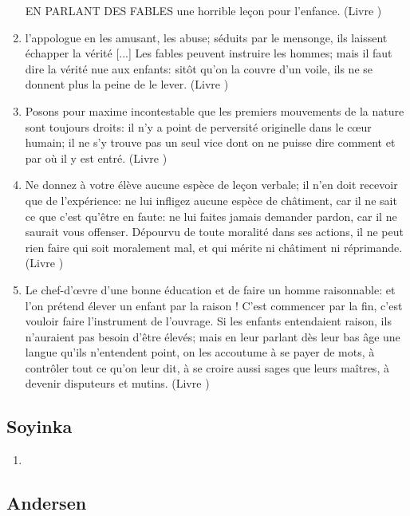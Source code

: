 \documentclass[a4paper, 11pt, hidelinks]{article}
\newcommand{\rb}[1]{\Romanbar{#1}}
\begin{document}
\begin{enumerate}
    \item [EN PARLANT DES FABLES] une horrible leçon pour l'enfance. (Livre \rb{2})
    \item l'appologue en les amusant, les abuse; séduits par le mensonge, ils laissent échapper la vérité [...] Les fables peuvent instruire les hommes; mais il faut dire la vérité nue aux enfants: sitôt qu'on la couvre d'un voile, ils ne se donnent plus la peine de le lever. (Livre \rb{2})
    \item Posons pour maxime incontestable que les premiers mouvements de la nature sont toujours droits: il n'y a point de perversité originelle dans le c\oe ur humain; il ne s'y trouve pas un seul vice dont on ne puisse dire comment et par où il y est entré. (Livre \rb{2})
    \item Ne donnez à votre élève aucune espèce de leçon verbale; il n'en doit recevoir que de l'expérience: ne lui infligez aucune espèce de châtiment, car il ne sait ce que c'est qu'être en faute: ne lui faites jamais demander pardon, car il ne saurait vous offenser. Dépourvu de toute moralité dans ses actions, il ne peut rien faire qui soit moralement mal, et qui mérite ni châtiment ni réprimande. (Livre \rb{2})
    \item Le chef-d'\oe vre d'une bonne éducation et de faire un homme raisonnable: et l'on prétend élever un enfant par la raison ! C'est commencer par la fin, c'est vouloir faire l'instrument de l'ouvrage. Si les enfants entendaient raison, ils n'auraient pas besoin d'être élevés; mais en leur parlant dès leur bas âge une langue qu'ils n'entendent point, on les accoutume à se payer de mots, à contrôler tout ce qu'on leur dit, à se croire aussi sages que leurs maîtres, à devenir disputeurs et mutins. (Livre \rb{2})
\end{enumerate}



\subsection{Soyinka}


\begin{enumerate}
    \item 
\end{enumerate}




\subsection{Andersen}
\end{document}
